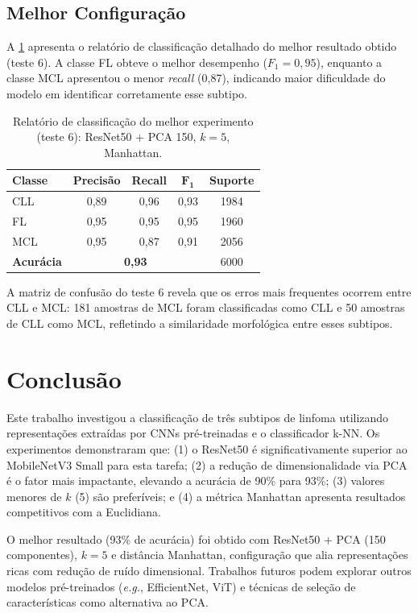 \documentclass[10pt,twocolumn,letterpaper]{article}
\begin{document}
\subsection{Melhor Configuração}

A \cref{tab:melhor} apresenta o relatório de classificação detalhado do melhor resultado obtido (teste 6). A classe FL obteve o melhor desempenho ($F_1 = 0{,}95$), enquanto a classe MCL apresentou o menor \textit{recall} (0,87), indicando maior dificuldade do modelo em identificar corretamente esse subtipo.

\begin{table}[t]
\centering
\caption{Relatório de classificação do melhor experimento (teste 6): ResNet50 + PCA 150, $k=5$, Manhattan.}
\label{tab:melhor}
\begin{tabular}{@{}lcccc@{}}
\toprule
\textbf{Classe} & \textbf{Precisão} & \textbf{Recall} & $\boldsymbol{F_1}$ & \textbf{Suporte} \\
\midrule
CLL  & 0,89 & 0,96 & 0,93 & 1984 \\
FL   & 0,95 & 0,95 & 0,95 & 1960 \\
MCL  & 0,95 & 0,87 & 0,91 & 2056 \\
\midrule
\textbf{Acurácia} & \multicolumn{3}{c}{\textbf{0,93}} & 6000 \\
\bottomrule
\end{tabular}
\end{table}

A matriz de confusão do teste 6 revela que os erros mais frequentes ocorrem entre CLL e MCL: 181 amostras de MCL foram classificadas como CLL e 50 amostras de CLL como MCL, refletindo a similaridade morfológica entre esses subtipos.

\section{Conclusão}
\label{sec:conclusao}

Este trabalho investigou a classificação de três subtipos de linfoma utilizando representações extraídas por CNNs pré-treinadas e o classificador k-NN. Os experimentos demonstraram que: (1) o ResNet50 é significativamente superior ao MobileNetV3 Small para esta tarefa; (2) a redução de dimensionalidade via PCA é o fator mais impactante, elevando a acurácia de 90\% para 93\%; (3) valores menores de $k$ (5) são preferíveis; e (4) a métrica Manhattan apresenta resultados competitivos com a Euclidiana.

O melhor resultado (93\% de acurácia) foi obtido com ResNet50 + PCA (150 componentes), $k=5$ e distância Manhattan, configuração que alia representações ricas com redução de ruído dimensional. Trabalhos futuros podem explorar outros modelos pré-treinados (\textit{e.g.}, EfficientNet, ViT) e técnicas de seleção de características como alternativa ao PCA.

{\small


}
\end{document}
